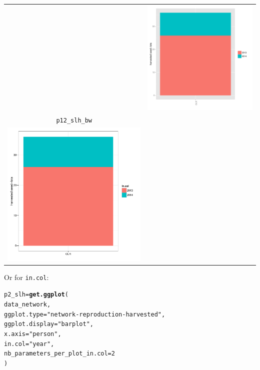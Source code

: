 \documentclass{article}\usepackage[]{graphicx}\usepackage[]{color}
\makeatletter
\newcommand{\hlnum}[1]{\textcolor[rgb]{0.686,0.059,0.569}{#1}}%
\newcommand{\hlstr}[1]{\textcolor[rgb]{0.192,0.494,0.8}{#1}}%
\newcommand{\hlstd}[1]{\textcolor[rgb]{0.345,0.345,0.345}{#1}}%
\newcommand{\hlkwb}[1]{\textcolor[rgb]{0.69,0.353,0.396}{#1}}%
\newcommand{\hlkwc}[1]{\textcolor[rgb]{0.333,0.667,0.333}{#1}}%
\newcommand{\hlkwd}[1]{\textcolor[rgb]{0.737,0.353,0.396}{\textbf{#1}}}%
\newenvironment{kframe}{%
 \def\at@end@of@kframe{}%
 \ifinner\ifhmode%
  \def\at@end@of@kframe{\end{minipage}}%
  \begin{minipage}{\columnwidth}%
 \fi\fi%
 \def\FrameCommand##1{\hskip\@totalleftmargin \hskip-\fboxsep
 \colorbox{shadecolor}{##1}\hskip-\fboxsep
     \hskip-\linewidth \hskip-\@totalleftmargin \hskip\columnwidth}%
 \MakeFramed {\advance\hsize-\width
   \@totalleftmargin\z@ \linewidth\hsize
   \@setminipage}}%
 {\par\unskip\endMakeFramed%
 \at@end@of@kframe}
\newenvironment{knitrout}{}{} %
\makeatother
\begin{document}
\begin{itemize}
\begin{center}
\begin{tabular}{cc}
\begin{knitrout}
{}



\end{knitrout}
&
\begin{knitrout}
\definecolor{shadecolor}{rgb}{0.969, 0.969, 0.969}\color{fgcolor}

{\centering \includegraphics[width=.4\textwidth]{figures/shinemas2R_unnamed-chunk-42-1} 

}



\end{knitrout}
\\
\texttt{p12\_slh\_bw} &  \\
\begin{knitrout}
\definecolor{shadecolor}{rgb}{0.969, 0.969, 0.969}\color{fgcolor}

{\centering \includegraphics[width=.4\textwidth]{figures/shinemas2R_unnamed-chunk-43-1} 

}



\end{knitrout}
&
\\
\end{tabular}
\end{center}



Or for \texttt{in.col}:
\begin{knitrout}
\color{fgcolor}\begin{kframe}
\begin{alltt}
\hlstd{p2_slh} \hlkwb{=} \hlkwd{get.ggplot}\hlstd{(}
        \hlstd{data_network,}
        \hlkwc{ggplot.type} \hlstd{=} \hlstr{"network-reproduction-harvested"}\hlstd{,}
        \hlkwc{ggplot.display} \hlstd{=} \hlstr{"barplot"}\hlstd{,}
        \hlkwc{x.axis} \hlstd{=} \hlstr{"person"}\hlstd{,}
        \hlkwc{in.col} \hlstd{=} \hlstr{"year"}\hlstd{,}
        \hlkwc{nb_parameters_per_plot_in.col} \hlstd{=} \hlnum{2}
        \hlstd{)}


\end{alltt}
\end{kframe}
\end{knitrout}
\end{itemize}
\end{document}
